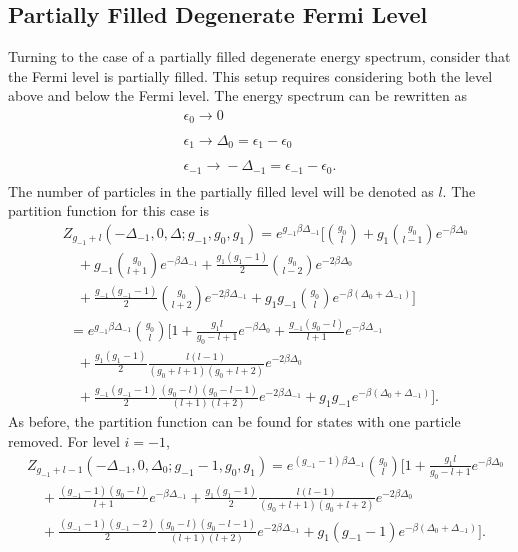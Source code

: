 \subsection{Partially Filled Degenerate Fermi Level}
Turning to the case of a partially filled degenerate energy spectrum, consider that the Fermi level is partially filled. This setup requires considering both the level above and below the Fermi level. The energy spectrum can be rewritten as 
\begin{gather}
    \epsilon_0 \xrightarrow[]{} 0\nonumber\\
    \epsilon_1 \xrightarrow[]{} \Delta_0=\epsilon_1-\epsilon_0\nonumber\\
    \epsilon_{-1} \xrightarrow[]{} -\Delta_{-1}=\epsilon_{-1}-\epsilon_0.\nonumber
\end{gather}
The number of particles in the partially filled level will be denoted as $l$. The partition function for this case is 
\begin{align}
    &Z_{g_{-1}+l}(-\Delta_{-1},0,\Delta;g_{-1},g_0,g_1) = e^{g_{-1}\beta\Delta_{-1}} \Biggr[{g_0\choose l}+g_1{g_0\choose l-1}e^{-\beta\Delta_0} \nonumber\\
    &\quad +g_{-1}{g_0\choose l+1}e^{-\beta\Delta_{-1}} +\frac{g_1(g_1-1)}{2} {g_0\choose l-2}e^{-2\beta\Delta_0}\nonumber\\ 
    &\quad +\frac{g_{-1}(g_{-1}-1)}{2} {g_0\choose l+2} e^{-2\beta\Delta_{-1}} +g_1g_{-1}{g_0\choose l} e^{-\beta(\Delta_0+\Delta_{-1})} \Biggr]\nonumber\\
    &\ \ =e^{g_{-1}\beta\Delta_{-1}} {g_0\choose l} \Biggr[1+ \frac{g_1 l}{g_0-l+1} e^{-\beta\Delta_0} +\frac{g_{-1}(g_0-l)}{l+1} e^{-\beta\Delta_{-1}} \nonumber\\
    &\quad+\frac{g_1(g_1-1)}{2} \frac{l(l-1)}{(g_0+l+1)(g_0+l+2)}e^{-2\beta\Delta_0} \nonumber\\
    &\quad+\frac{g_{-1}(g_{-1}-1)}{2} \frac{(g_0-l)(g_0-l-1)}{(l+1)(l+2)} e^{-2\beta\Delta_{-1}}+g_1g_{-1}e^{-\beta(\Delta_0+\Delta_{-1})}\Biggr].
\end{align}
As before, the partition function can be found for states with one particle removed. For level $i=-1$,
\begin{align}
    &Z_{g_{-1}+l-1}(-\Delta_{-1},0,\Delta_0;g_{-1}-1,g_0,g_1)=e^{(g_{-1}-1)\beta\Delta_{-1}} {g_0\choose l} \Biggr[1+\frac{g_1 l}{g_0-l+1} e^{-\beta\Delta_0} \nonumber\\
    &\quad +\frac{(g_{-1}-1)(g_0-l)}{l+1} e^{-\beta\Delta_{-1}}+\frac{g_1(g_1-1)}{2} \frac{l(l-1)}{(g_0+l+1)(g_0+l+2)}e^{-2\beta\Delta_0} \nonumber\\
    &\quad+\frac{(g_{-1}-1)(g_{-1}-2)}{2} \frac{(g_0-l)(g_0-l-1)}{(l+1)(l+2)} e^{-2\beta\Delta_{-1}}+g_1(g_{-1}-1)e^{-\beta(\Delta_0+\Delta_{-1})}\Biggr].
\end{align}
